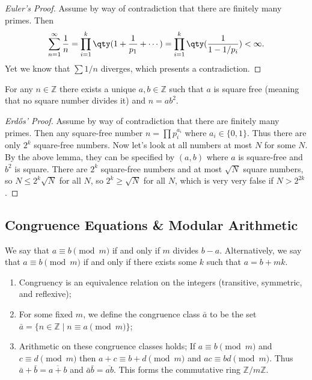 \begin{proof}[Euler's Proof]
Assume by way of contradiction that there are finitely many primes. Then 
\[ \sum_{n=1}^\infty \frac{1}{n} = \prod_{i=1}^k\qty(1 + \frac{1}{p_1} + \cdots) = \prod_{i=1}^k \qty(\frac{1}{1-1/p_i}) < \infty. \]
Yet we know that $\sum 1/n$ diverges, which presents a contradiction.
\end{proof}

\begin{lemma}
For any $n \in \mathbb{Z}$ there exists a unique $a,b \in \mathbb{Z}$ such that $a$ is square free (meaning that no square number divides it) and $n = ab^2$.
\end{lemma}

\begin{proof}[Erdős' Proof]
Assume by way of contradiction that there are finitely many primes. Then any square-free number $n = \prod p_i^{a_i}$ where $a_i \in \{0,1\}$. Thus there are only $2^k$ square-free numbers. Now let's look at all numbers at most $N$ for some $N$. By the above lemma, they can be specified by $(a,b)$ where $a$ is square-free and $b^2$ is square. There are $2^k$ square-free numbers and at most $\sqrt{N}$ square numbers, so $N \leq 2^k\sqrt{N}$ for all $N$, so $2^k \geq \sqrt{N}$ for all $N$, which is very very false if $N > 2^{2k}$.
\end{proof}

\subsection{Congruence Equations \& Modular Arithmetic}

\begin{definition}[Congruence]
We say that $a \equiv b \pmod{m}$ if and only if $m$ divides $b-a$. Alternatively, we say that $a \equiv b \pmod{m}$ if and only if there exists some $k$ such that $a = b + mk$.
\end{definition}

\begin{theorem} \hfill
\begin{enumerate}
\item Congruency is an equivalence relation on the integers (transitive, symmetric, and reflexive);
\item For some fixed $m$, we define the congruence class $\bar{a}$ to be the set $\bar{a} = \{n \in \mathbb{Z} \mid n \equiv a \pmod{m}\}$;
\item Arithmetic on these congruence classes holds; If $a \equiv b \pmod{m}$ and $c \equiv d \pmod{m}$ then $a+c \equiv b + d \pmod{m}$ and $ac \equiv bd \pmod{m}$. Thus $\bar{a} + \bar{b} = \overline{a + b}$ and $\bar{a}\bar{b} = \overline{ab}$. This forms the commutative ring $\mathbb{Z}/m\mathbb{Z}$.
\end{enumerate}
\end{theorem}

